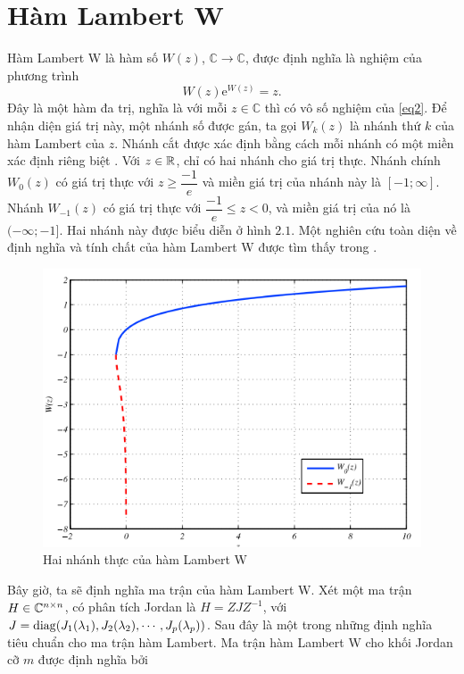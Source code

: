 \section{Hàm Lambert W}
Hàm Lambert W là hàm số $W(z)$, $\mathbb{C} \to \mathbb{C}$, được định nghĩa là nghiệm của phương trình
\begin{equation}\label{eq2}
	W(z) \mathrm{e}^{W(z) }=z.
\end{equation}
Đây là một hàm đa trị, nghĩa là với mỗi $z \in \mathbb{C}$ thì có vô số nghiệm của \eqref{eq2}. Để nhận diện giá trị này, một nhánh số được gán, ta gọi $W_k(z)$ là nhánh thứ $k$ của hàm Lambert của $z$. Nhánh cắt được xác định bằng cách mỗi nhánh có một miền xác định riêng biệt \cite{Cor96}. Với $z \in \mathbb{R}$, chỉ có hai nhánh cho giá trị thực. Nhánh chính $W_0(z)$ có giá trị thực với $z \ge \dfrac{-1}{e}$ và miền giá trị của nhánh này là $[-1;\infty]$. Nhánh $W_{-1}(z)$ có giá trị thực với $\dfrac{-1}{e} \le z < 0$, và miền giá trị của nó là $(-\infty; -1]$. Hai nhánh này được biểu diễn ở hình $2.1$.
Một nghiên cứu toàn diện về định nghĩa và tính chất của hàm Lambert W được tìm thấy trong \cite{Cor96}.
\begin{figure}[h!]
	\centering
	\includegraphics[scale= 0.7]{"./Hinh/Hinh 1"}
	\caption[Hai nhánh thực của hàm Lambert W]{Hai nhánh thực của hàm Lambert W}
	\label{fig:hinh-1}
\end{figure}
Bây giờ, ta sẽ định nghĩa ma trận của hàm Lambert W. Xét một ma trận $H \in \mathbb{C} ^{n\times n}$, có phân tích Jordan là $H = ZJZ^{-1}$, với $J = \mathrm{diag} (J_1(\lambda_1),J_2(\lambda_2), \cdots , J_p(\lambda_p) )$. Sau đây là một trong những định nghĩa tiêu chuẩn cho ma trận hàm Lambert. Ma trận hàm Lambert W cho khối Jordan cỡ $m$ được định nghĩa bởi
